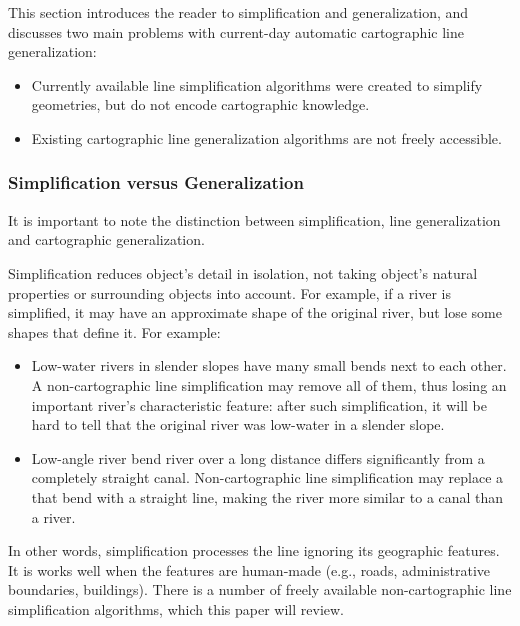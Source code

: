 \documentclass[a4paper]{article}
\begin{document}
This section introduces the reader to simplification and generalization, and
discusses two main problems with current-day automatic cartographic line
generalization:

\begin{itemize}
    \item Currently available line simplification algorithms were created
        to simplify geometries, but do not encode cartographic knowledge.

    \item Existing cartographic line generalization algorithms are not freely
        accessible.
\end{itemize}

\subsubsection{Simplification versus Generalization}

It is important to note the distinction between simplification, line
generalization and cartographic generalization.

Simplification reduces object's detail in isolation, not taking object's
natural properties or surrounding objects into account. For example, if a
river is simplified, it may have an approximate shape of the original river,
but lose some shapes that define it. For example:

\begin{itemize}

  \item Low-water rivers in slender slopes have many small bends next to each
      other. A non-cartographic line simplification may remove all of them,
        thus losing an important river's characteristic feature: after such
        simplification, it will be hard to tell that the original river was
        low-water in a slender slope.

  \item Low-angle river bend river over a long distance differs significantly
      from a completely straight canal. Non-cartographic line simplification
        may replace a that bend with a straight line, making the river more
        similar to a canal than a river.

\end{itemize}

In other words, simplification processes the line ignoring its geographic
features. It is works well when the features are human-made (e.g., roads,
administrative boundaries, buildings). There is a number of freely available
non-cartographic line simplification algorithms, which this paper will review.
\end{document}
